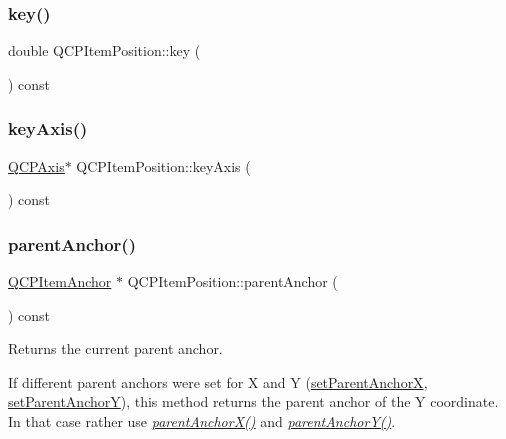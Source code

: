 \subsubsection{\texorpdfstring{key()}{key()}}
{\footnotesize\ttfamily double Q\+C\+P\+Item\+Position\+::key (\begin{DoxyParamCaption}{ }\end{DoxyParamCaption}) const\hspace{0.3cm}{\ttfamily [inline]}}

\mbox{\label{class_q_c_p_item_position_a9ad34861fbfd8be8b8270c16f879169c}} 
\subsubsection{\texorpdfstring{keyAxis()}{keyAxis()}}
{\footnotesize\ttfamily \mbox{\hyperlink{class_q_c_p_axis}{Q\+C\+P\+Axis}}$\ast$ Q\+C\+P\+Item\+Position\+::key\+Axis (\begin{DoxyParamCaption}{ }\end{DoxyParamCaption}) const\hspace{0.3cm}{\ttfamily [inline]}}

\mbox{\label{class_q_c_p_item_position_a0a87f9dce1af6cc9b510785991bcf1c6}} 
\subsubsection{\texorpdfstring{parentAnchor()}{parentAnchor()}}
{\footnotesize\ttfamily \mbox{\hyperlink{class_q_c_p_item_anchor}{Q\+C\+P\+Item\+Anchor}} $\ast$ Q\+C\+P\+Item\+Position\+::parent\+Anchor (\begin{DoxyParamCaption}{ }\end{DoxyParamCaption}) const\hspace{0.3cm}{\ttfamily [inline]}}

Returns the current parent anchor.

If different parent anchors were set for X and Y (\mbox{\hyperlink{class_q_c_p_item_position_add71461a973927c74e42179480916d9c}{set\+Parent\+AnchorX}}, \mbox{\hyperlink{class_q_c_p_item_position_add5ec1db9d19cec58a3b5c9e0a0c3f9d}{set\+Parent\+AnchorY}}), this method returns the parent anchor of the Y coordinate. In that case rather use {\itshape \mbox{\hyperlink{class_q_c_p_item_position_a605cb8b2cf6044d3d03cb1a894faf98a}{parent\+Anchor\+X()}}} and {\itshape \mbox{\hyperlink{class_q_c_p_item_position_aa40afec791a4339b09572922ca425ec2}{parent\+Anchor\+Y()}}}.

